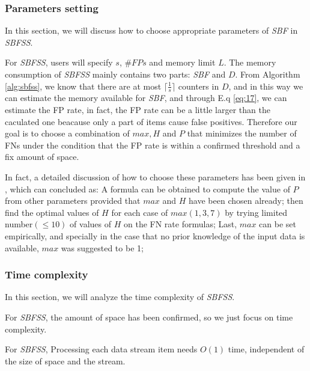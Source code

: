 \documentclass[conference]{IEEEtran}
\begin{document}
\subsubsection{\textbf{Parameters setting}}
In this section, we will discuss how to choose appropriate parameters of \emph{SBF} in \emph{SBFSS}.\par 
For \emph{SBFSS}, users will specify $s$, $\#FPs$ and memory limit $L$. The memory consumption of \emph{SBFSS} mainly contains two parts: \emph{SBF} and $D$. From Algorithm \ref{alg:sbfss}, we know that there are at most $\lceil\frac{1}{s}\rceil$ counters in $D$, and in this way we can estimate the memory available for \emph{SBF}, and through E.q \ref{eq:17}, we can estimate the FP rate, in fact, the FP rate can be a little larger than the caculated one beacause only a part of items cause false positives. Therefore our goal is to choose a combination of $max,H$ and $P$ that minimizes the number of FNs under the condition that the FP rate is within a confirmed threshold and a fix amount of space.\par
In fact, a detailed discussion of how to choose these parameters has been given in \cite{IEEEexample:sbf}, which can concluded as: A formula can be obtained to compute the value of $P$ from other parameters provided that $max$ and $H$ have been chosen already; then find the optimal values of $H$ for each case of $max(1,3,7)$ by trying limited number$(\leq 10)$ of values of $H$ on the FN rate formulas; Last, $max$ can be set empirically, and specially in the case that no prior knowledge of the input data is available, $max$ was suggested to be 1; 

\subsubsection{\textbf{Time complexity}}
In this section, we will analyze the time complexity of \emph{SBFSS}.\par
For \emph{SBFSS}, the amount of space has been confirmed, so we just focus on time complexity.

\begin{theorem}\label{thm:8}
For \emph{SBFSS}, Processing each data stream item needs $O(1)$ time, independent of the size of space and the stream.
\end{theorem}
\end{document}
